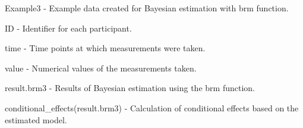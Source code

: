 Example3 - Example data created for Bayesian estimation with brm function.

ID - Identifier for each participant.

time - Time points at which measurements were taken.

value - Numerical values of the measurements taken.

result.brm3 - Results of Bayesian estimation using the brm function.

conditional_effects(result.brm3) - Calculation of conditional effects based on the estimated model.
